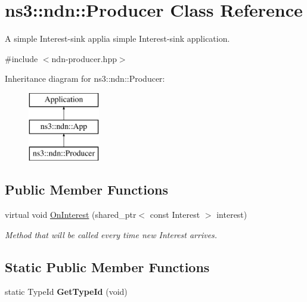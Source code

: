 \hypertarget{classns3_1_1ndn_1_1Producer}{}\section{ns3\+:\+:ndn\+:\+:Producer Class Reference}
\label{classns3_1_1ndn_1_1Producer}


A simple Interest-\/sink applia simple Interest-\/sink application.  




{\ttfamily \#include $<$ndn-\/producer.\+hpp$>$}

Inheritance diagram for ns3\+:\+:ndn\+:\+:Producer\+:\begin{figure}[H]
\begin{center}
\leavevmode
\includegraphics[height=3.000000cm]{classns3_1_1ndn_1_1Producer}
\end{center}
\end{figure}
\subsection*{Public Member Functions}
\begin{DoxyCompactItemize}
\item 
virtual void \hyperlink{classns3_1_1ndn_1_1Producer_aec531ffef54f9970c6d8cba664ef5107}{On\+Interest} (shared\+\_\+ptr$<$ const Interest $>$ interest)
\begin{DoxyCompactList}\small\item\em Method that will be called every time new Interest arrives. \end{DoxyCompactList}\end{DoxyCompactItemize}
\subsection*{Static Public Member Functions}
\begin{DoxyCompactItemize}
\item 
static Type\+Id {\bfseries Get\+Type\+Id} (void)\hypertarget{classns3_1_1ndn_1_1Producer_a61f10425ddad0fe750183ece60385cc9}{}\label{classns3_1_1ndn_1_1Producer_a61f10425ddad0fe750183ece60385cc9}

\end{DoxyCompactItemize}
